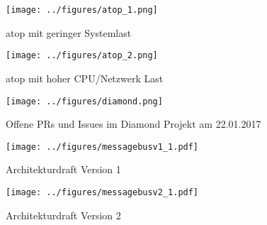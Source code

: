 \begin{figure}[tbph]
  \centering
  \texttt{[image: ../figures/atop\_1.png]}
  \caption{atop mit geringer Systemlast}
\label{figure:atop1}
\end{figure}

\begin{figure}[tbp]
  \centering
  \texttt{[image: ../figures/atop\_2.png]}
  \caption{atop mit hoher CPU/Netzwerk Last}
\label{figure:atop2}
\end{figure}

\begin{figure}[tbp]
  \centering
  \texttt{[image: ../figures/diamond.png]}
  \caption{Offene PRs und Issues im Diamond Projekt am 22.01.2017}
\label{figure:diamond}
\end{figure}

\begin{figure}[tbp]
  \centering
  \texttt{[image: ../figures/messagebusv1\_1.pdf]}
  \caption{Architekturdraft Version 1}
\label{figure:draft1}
\end{figure}
\begin{figure}[tbp]
  \centering
  \texttt{[image: ../figures/messagebusv2\_1.pdf]}
  \caption{Architekturdraft Version 2}
\label{figure:draft2}
\end{figure}
\FloatBarrier{}

